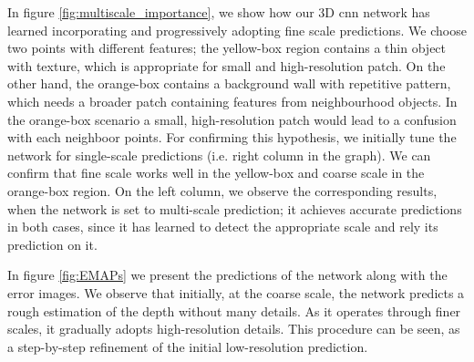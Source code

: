 \documentclass[runningheads]{llncs}
\begin{document}
In figure \ref{fig:multiscale_importance}, we show how our 3D cnn network has learned incorporating and progressively adopting fine scale predictions. We choose two points with different features; the yellow-box region contains a thin object with texture, which is appropriate for small and high-resolution patch. On the other hand, the orange-box contains a background wall with repetitive pattern, which needs a broader patch containing features from neighbourhood objects. In the orange-box scenario a small, high-resolution patch would lead to a confusion with each neighboor points. For confirming this hypothesis, we initially tune the network for single-scale predictions (i.e. right column in the graph). We can confirm that fine scale works well in the yellow-box and coarse scale in the orange-box region. On the left column, we observe the corresponding results, when the network is set to multi-scale prediction; it achieves accurate predictions in both cases, since it has learned to detect the appropriate scale and rely its prediction on it.

In figure \ref{fig:EMAPs} we present the predictions of the network along with the error images. We observe that initially, at the coarse scale, the network predicts a rough estimation of the depth without many details. As it operates through finer scales, it gradually adopts high-resolution details. This procedure can be seen, as a step-by-step refinement of the initial low-resolution prediction.
\end{document}
